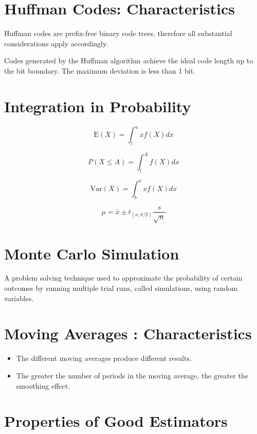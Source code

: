 \section{Huffman Codes: Characteristics}

Huffman codes are prefix-free binary code trees, therefore all substantial considerations apply accordingly.

Codes generated by the Huffman algorithm achieve the ideal code length up to the bit boundary.
The maximum deviation is less than 1 bit.
\section{Integration in Probability}

\[ \mbox{E}(X) = \int^{u}_{l} x f(X) dx \]

\[ P(X \leq A)  = \int^{A}_{l} f(X) dx \]

\[ \mbox{Var}(X) = \int^{a}_{b} x f(X) dx \]


\[ \mu = \bar{x} \pm t_{(\nu,\sigma/2)}\frac{s}{\sqrt{n}}  \]




\section{Monte Carlo Simulation}

A problem solving technique used to approximate the probability of certain outcomes by running multiple trial runs, called simulations, using random variables.
\section{ Moving Averages : Characteristics}
\begin{itemize}
	\item The different moving averages produce different results.
	\item The greater the number of periods in the moving average, the greater the smoothing effect.
\end{itemize}


\section{Properties of Good Estimators}

